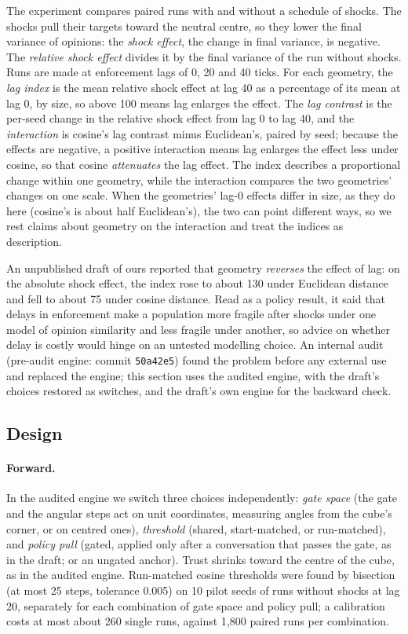 \documentclass[11pt]{article}
\begin{document}
The experiment compares paired runs with and without a schedule of shocks.
The shocks pull their targets toward the neutral centre, so they lower the final variance of opinions: the \emph{shock effect}, the change in final variance, is negative.
The \emph{relative shock effect} divides it by the final variance of the run without shocks.
Runs are made at enforcement lags of 0, 20 and 40 ticks.
For each geometry, the \emph{lag index} is the mean relative shock effect at lag 40 as a percentage of its mean at lag 0, by size, so above 100 means lag enlarges the effect.
The \emph{lag contrast} is the per-seed change in the relative shock effect from lag 0 to lag 40, and the \emph{interaction} is cosine's lag contrast minus Euclidean's, paired by seed; because the effects are negative, a positive interaction means lag enlarges the effect less under cosine, so that cosine \emph{attenuates} the lag effect.
The index describes a proportional change within one geometry, while the interaction compares the two geometries' changes on one scale.
When the geometries' lag-0 effects differ in size, as they do here (cosine's is about half Euclidean's), the two can point different ways, so we rest claims about geometry on the interaction and treat the indices as description.

An unpublished draft of ours reported that geometry \emph{reverses} the effect of lag: on the absolute shock effect, the index rose to about 130 under Euclidean distance and fell to about 75 under cosine distance.
Read as a policy result, it said that delays in enforcement make a population more fragile after shocks under one model of opinion similarity and less fragile under another, so advice on whether delay is costly would hinge on an untested modelling choice.
An internal audit (pre-audit engine: commit \texttt{50a42e5}) found the problem before any external use and replaced the engine; this section uses the audited engine, with the draft's choices restored as switches, and the draft's own engine for the backward check.

\subsection{Design}
\paragraph{Forward.} In the audited engine we switch three choices independently: \emph{gate space} (the gate and the angular steps act on unit coordinates, measuring angles from the cube's corner, or on centred ones), \emph{threshold} (shared, start-matched, or run-matched), and \emph{policy pull} (gated, applied only after a conversation that passes the gate, as in the draft; or an ungated anchor). Trust shrinks toward the centre of the cube, as in the audited engine. Run-matched cosine thresholds were found by bisection (at most 25 steps, tolerance 0.005) on 10 pilot seeds of runs without shocks at lag 20, separately for each combination of gate space and policy pull; a calibration costs at most about 260 single runs, against 1{,}800 paired runs per combination.
\end{document}
